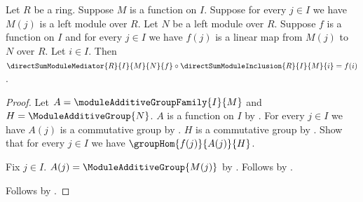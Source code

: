 \begin{theorem}\label{direct_sum_module_mediator_factorization}
    Let $R$ be a ring.
    Suppose $M$ is a function on $I$.
    Suppose for every $j\in I$ we have $M(j)$ is a left module over $R$.
    Let $N$ be a left module over $R$.
    Suppose $f$ is a function on $I$ and for every $j\in I$ we have
        $f(j)$ is a linear map from $M(j)$ to $N$ over $R$.
    Let $i\in I$.
    Then
        $\directSumModuleMediator{R}{I}{M}{N}{f}\circ
            \directSumModuleInclusion{R}{I}{M}{i}=f(i)$.
\end{theorem}
\begin{proof}
    Let $A=\moduleAdditiveGroupFamily{I}{M}$ and
        $H=\ModuleAdditiveGroup{N}$.
    $A$ is a function on $I$ by
        .
    For every $j\in I$ we have $A(j)$ is a commutative group by
        .
    $H$ is a commutative group by
        .
    Show that for every $j\in I$ we have $\groupHom{f(j)}{A(j)}{H}$.
    \begin{subproof}
        Fix $j\in I$.
        $A(j)=\ModuleAdditiveGroup{M(j)}$ by
            .
        Follows by .
    \end{subproof}
    Follows by
        .
\end{proof}

